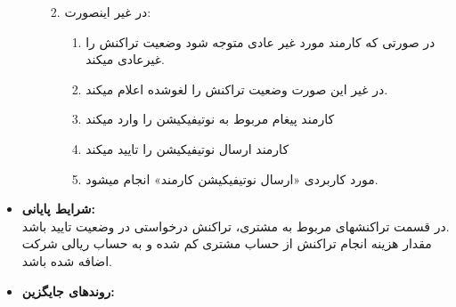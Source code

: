 \documentclass{article}
\begin{document}
\begin{itemize}
\begin{enumerate}
\begin{enumerate}
\begin{enumerate}
\end{enumerate}
\item در غیر اینصورت:
\begin{enumerate}
\item  در صورتی که کارمند مورد غیر عادی متوجه شود وضعیت تراکنش را غیرعادی میکند.
\item در غیر این صورت وضعیت تراکنش را لغوشده اعلام میکند.
\item کارمند پیغام مربوط به نوتیفیکیشن را وارد میکند
\item کارمند ارسال نوتیفیکیشن را تایید میکند
\item مورد کاربردی  «ارسال نوتیفیکیشن کارمند» انجام میشود.
\end{enumerate}
\end{enumerate}

\end{enumerate}

\item \textbf{شرایط پایانی:}\\ 
در قسمت تراکنشهای مربوط به مشتری، تراکنش درخواستی در وضعیت تایید باشد.\\
مقدار هزینه انجام تراکنش از حساب مشتری کم شده و به حساب ریالی شرکت اضافه شده باشد.\\
\item \textbf{روندهای جایگزین:}\\


\end{itemize}

\noindent\makebox[\linewidth]{\rule{\paperwidth}{0.4pt}}
\end{document}
